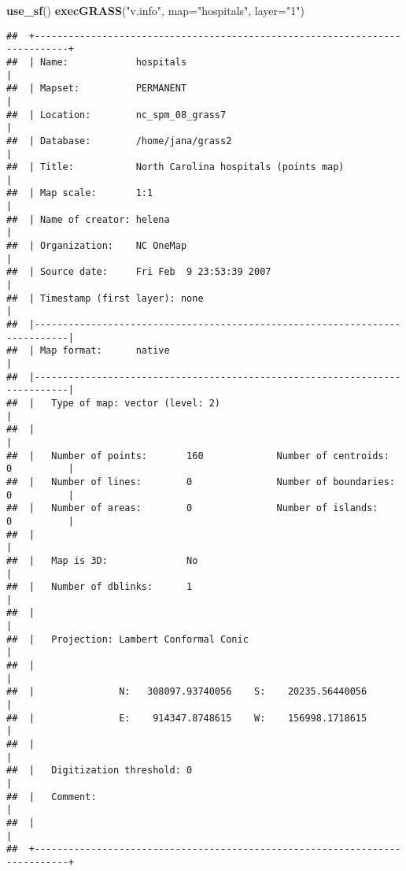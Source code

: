\documentclass[]{article}
\newenvironment{Shaded}{\begin{snugshade}}{\end{snugshade}}
\newcommand{\KeywordTok}[1]{\textcolor[rgb]{0.13,0.29,0.53}{\textbf{#1}}}
\newcommand{\DataTypeTok}[1]{\textcolor[rgb]{0.13,0.29,0.53}{#1}}
\newcommand{\StringTok}[1]{\textcolor[rgb]{0.31,0.60,0.02}{#1}}
\newcommand{\NormalTok}[1]{#1}
\begin{document}
\begin{Shaded}
\begin{Highlighting}[]
\KeywordTok{use_sf}\NormalTok{()}
\KeywordTok{execGRASS}\NormalTok{(}\StringTok{"v.info"}\NormalTok{, }\DataTypeTok{map=}\StringTok{"hospitals"}\NormalTok{, }\DataTypeTok{layer=}\StringTok{"1"}\NormalTok{)}
\end{Highlighting}
\end{Shaded}

\begin{verbatim}
##  +----------------------------------------------------------------------------+
##  | Name:            hospitals                                                 |
##  | Mapset:          PERMANENT                                                 |
##  | Location:        nc_spm_08_grass7                                          |
##  | Database:        /home/jana/grass2                                         |
##  | Title:           North Carolina hospitals (points map)                     |
##  | Map scale:       1:1                                                       |
##  | Name of creator: helena                                                    |
##  | Organization:    NC OneMap                                                 |
##  | Source date:     Fri Feb  9 23:53:39 2007                                  |
##  | Timestamp (first layer): none                                              |
##  |----------------------------------------------------------------------------|
##  | Map format:      native                                                    |
##  |----------------------------------------------------------------------------|
##  |   Type of map: vector (level: 2)                                           |
##  |                                                                            |
##  |   Number of points:       160             Number of centroids:  0          |
##  |   Number of lines:        0               Number of boundaries: 0          |
##  |   Number of areas:        0               Number of islands:    0          |
##  |                                                                            |
##  |   Map is 3D:              No                                               |
##  |   Number of dblinks:      1                                                |
##  |                                                                            |
##  |   Projection: Lambert Conformal Conic                                      |
##  |                                                                            |
##  |               N:   308097.93740056    S:    20235.56440056                 |
##  |               E:    914347.8748615    W:    156998.1718615                 |
##  |                                                                            |
##  |   Digitization threshold: 0                                                |
##  |   Comment:                                                                 |
##  |                                                                            |
##  +----------------------------------------------------------------------------+
\end{verbatim}
\end{document}
